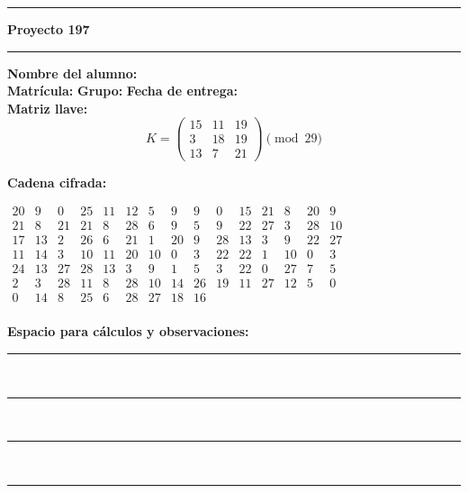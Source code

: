 \documentclass{article}%
\begin{document}
\bigskip
\hrule
\bigskip%

\textbf{Proyecto 197}\\[2pt]
\hrule
\bigskip

\textbf{Nombre del alumno:} \underline{\hspace{8cm}}\\[8pt]
\textbf{Matrícula:} \underline{\hspace{4cm}} \hspace{1cm}
\textbf{Grupo:} \underline{\hspace{2cm}} \hspace{1cm}
\textbf{Fecha de entrega:} \underline{\hspace{2.5cm}}\\[12pt]

\textbf{Matriz llave:}
\[
K = \begin{pmatrix}
15 & 11 & 19 \\
3 & 18 & 19 \\
13 & 7 & 21
\end{pmatrix} \pmod{29}
\]

\textbf{Cadena cifrada:}
\begin{center}
$\begin{array}{lllllllllllllll}
20 & 9 & 0 & 25 & 11 & 12 & 5 & 9 & 9 & 0 & 15 & 21 & 8 & 20 & 9\\
21 & 8 & 21 & 21 & 8 & 28 & 6 & 9 & 5 & 9 & 22 & 27 & 3 & 28 & 10\\
17 & 13 & 2 & 26 & 6 & 21 & 1 & 20 & 9 & 28 & 13 & 3 & 9 & 22 & 27\\
11 & 14 & 3 & 10 & 11 & 20 & 10 & 0 & 3 & 22 & 22 & 1 & 10 & 0 & 3\\
24 & 13 & 27 & 28 & 13 & 3 & 9 & 1 & 5 & 3 & 22 & 0 & 27 & 7 & 5\\
2 & 3 & 28 & 11 & 8 & 28 & 10 & 14 & 26 & 19 & 11 & 27 & 12 & 5 & 0\\
0 & 14 & 8 & 25 & 6 & 28 & 27 & 18 & 16\\
\end{array}$
\end{center}

\bigskip
\textbf{Espacio para cálculos y observaciones:}\\[6pt]
\rule{\linewidth}{0.4pt}\\[10pt]
\rule{\linewidth}{0.4pt}\\[10pt]
\rule{\linewidth}{0.4pt}\\[10pt]
\rule{\linewidth}{0.4pt}\\[10pt]
%
\end{document}
